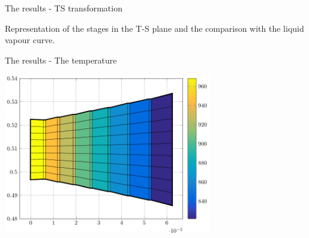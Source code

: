 \documentclass{beamer}
\newcommand{\myspaceneg}[0]{\vspace{-0.15cm}}
\begin{document}
\begin{frame}[t]{The results - TS transformation}
\begin{center}
Representation of the stages in the T-S plane and the comparison with the liquid vapour curve.
\end{center}
\vspace{-0.8cm}
\begin{figure}%
    \centering
\end{figure}
\end{frame}


\begin{frame}[t]{The results -  The temperature}

\myspaceneg
\myspaceneg
\begin{center}
\includegraphics[height=7cm]{fig/machine_T.pdf} 
\end{center}
\end{frame}
\end{document}
